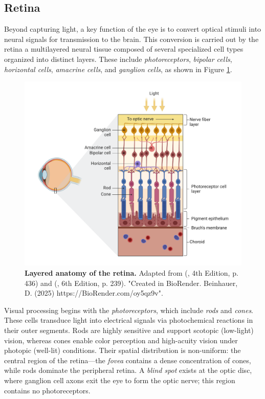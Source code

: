 \subsection{Retina}
\label{subsec:retina}

Beyond capturing light, a key function of the eye is to convert optical stimuli into neural signals for transmission to the brain. This conversion is carried out by the retina a multilayered neural tissue composed of several specialized cell types organized into distinct layers. These include \emph{photoreceptors}, \emph{bipolar cells}, \emph{horizontal cells}, \emph{amacrine cells}, and \emph{ganglion cells}, as shown in Figure \ref{fig:retina_anatomy}.

\begin{figure}
    \centering
    \includegraphics[width=\linewidth]{img/retina_anatomy.pdf}
    \caption{\textbf{Layered anatomy of the retina.} Adapted from (\citet{schwartz1991principles}, 4th Edition, p. 436) and (\citet{purves2019neurosciences}, 6th Edition, p. 239). "Created in BioRender. Beinhauer, D. (2025) https://BioRender.com/oy5qz9v".}
    \label{fig:retina_anatomy}
\end{figure}

Visual processing begins with the \emph{photoreceptors}, which include \emph{rods} and \emph{cones}. These cells transduce light into electrical signals via photochemical reactions in their outer segments. Rods are highly sensitive and support scotopic (low-light) vision, whereas cones enable color perception and high-acuity vision under photopic (well-lit) conditions. Their spatial distribution is non-uniform: the central region of the retina—the \emph{fovea} contains a dense concentration of cones, while rods dominate the peripheral retina. A \emph{blind spot} exists at the optic disc, where ganglion cell axons exit the eye to form the optic nerve; this region contains no photoreceptors.    

